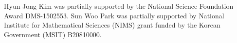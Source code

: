 \documentclass[12pt, reqno]{amsart}
\theoremstyle{definition}
\begin{document}
Hyun Jong Kim was partially supported by the National Science Foundation Award DMS-1502553. Sun Woo Park was partially supported by National Institute for Mathematical Sciences (NIMS) grant funded by the Korean Government (MSIT) B20810000.

\nocite{*}


\end{document}
